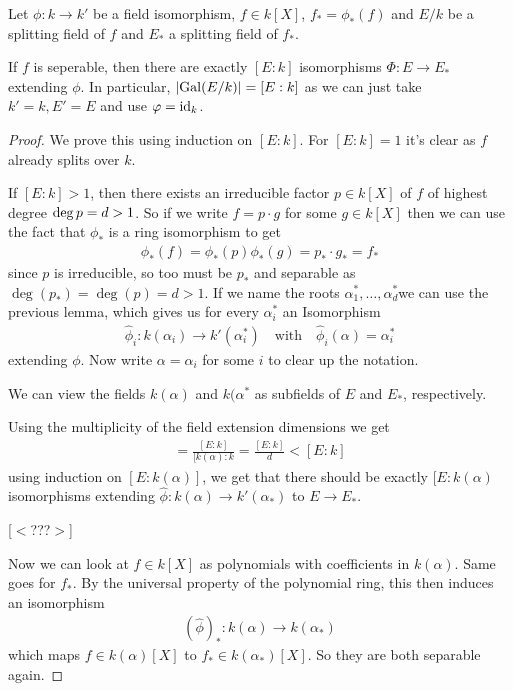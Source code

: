 \begin{thm}[Rotman 3.7]\label{thm:rot3-7}
  Let $\phi: k \to k'$ be a field isomorphism, $f \in k[X]$, $f_{\ast} = \phi_{\ast}(f)$ and $E/k$ be a splitting field of $f$ and $E_{\ast}$ a splitting field of $f_{\ast}$.
    
  If $f$ is seperable, then there are exactly $[E:k]$ isomorphisms $\Phi: E \to  E_{\ast}$ extending $\phi$.
  In particular, $\abs{\Gal(E/k)} = [E:k]$ as we can just take $k'=k, E'=E$ and use $\varphi = \operatorname{id}_k$.
\end{thm}
\begin{proof}
  We prove this using induction on $[E:k]$. For $[E:k]=1$ it's clear as $f$ already splits over $k$.

  If $[E:k] >1$, then there exists an irreducible factor $p \in k[X]$ of $f$ of highest degree $\operatorname{deg} p = d > 1$.
  So if we write $f = p \cdot g$ for some $g \in k[X]$ then we can use the fact that $\phi_{\ast}$ is a ring isomorphism to get
  \begin{align*}
    \phi_{\ast}(f) = \phi_{\ast}(p) \phi_{\ast}(g) = p_{\ast} \cdot g_{\ast} = f_{\ast}
  \end{align*}
  since $p$ is irreducible, so too must be $p_{\ast}$ and separable as $\deg(p_{\ast}) = \deg(p) = d > 1$. 
  If we name the roots $\alpha_{1}^{\ast}, \ldots, \alpha_{d}^{\ast}$we can use the previous lemma, which gives us for every $\alpha_i^{\ast}$ an Isomorphism
  \begin{align*}
    \hat{\phi}_i : k(\alpha_i)  \to  k'(\alpha_i^{\ast}) \quad \text{with} \quad \hat{\phi}_i(\alpha) = \alpha_i^{\ast}
  \end{align*}
  extending $\phi$. 
  Now write $\alpha = \alpha_i$ for some $i$ to clear up the notation.

  We can view the fields $k(\alpha)$ and $k(\alpha^{\ast}$ as subfields of $E$ and $E_{\ast}$, respectively.

  Using the multiplicity of the field extension dimensions we get
  \begin{align*}
    [E:k(\alpha)] = \frac{[E:k]}{[k(\alpha):k} = \frac{[E:k]}{d} < [E:k]
  \end{align*}
  using induction on $[E:k(\alpha)]$, we get that there should be exactly $[E:k(\alpha)$ isomorphisms extending $\hat{\phi}: k(\alpha) \to  k'(\alpha_{\ast})$ to $E \to  E_{\ast}$.


  [$<$???$>$]

  Now we can look at $f \in k[X]$ as polynomials with coefficients in $k(\alpha)$. Same goes for $f_{\ast}$. 
  By the universal property of the polynomial ring, this then induces an isomorphism
  \begin{align*}
    \left(
      \widehat{\phi}
    \right)_{\ast}
    :
    k(\alpha) \to 
    k(\alpha_{\ast}) 
  \end{align*}
  which maps $f \in k(\alpha)[X]$ to $f_{\ast} \in k(\alpha_{\ast})[X]$.
  So they are both separable again.


\end{proof}
